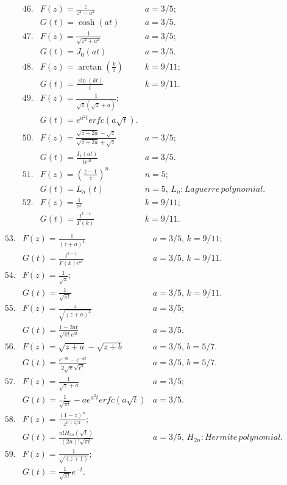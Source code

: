 \documentclass[10pt]{article}
\begin{document}
\[
\begin{array}{llr}
46. & F(z)= \frac{z}{z^{2}-a^{2}} &a=3/5; \\[1cm]
  & G(t)= \cosh(at)&a=3/5.\\[1cm]
47. & F(z)= \frac{1}{\sqrt{z^{2}+a^{2}}} &a=3/5; \\[1cm]
  & G(t)= J_0(at)& a=3/5. \\[1cm]
48. & F(z)= \arctan(\frac{k}{z})&k=9/11; \\[1cm]
  & G(t)= \frac{\sin(kt)}{t}& k=9/11. \\[1cm]
49. & F(z)= \frac{1}{\sqrt{z}(\sqrt{z}+a)};& \\[1cm]
  & G(t)= e^{a^{2}t}erfc(a\sqrt{t}).&  \\[1cm]
50. & F(z)= \frac{\sqrt{z+2a}-\sqrt{z}}{\sqrt{z+2a}+\sqrt{z}}& a=3/5;\\[1cm]
  & G(t)= \frac{I_1(at)}{te^{at}}& a=3/5.  \\[1cm]
51. & F(z)= (\frac{z-1}{z})^{n}& n=5; \\[1cm]
  & G(t)= L_n(t)& n=5, \, L_n: Laguerre \, polynomial. \\[1cm]
52. & F(z)= \frac{1}{z^{k}}&k=9/11; \\[1cm]
  & G(t)= \frac{t^{k-1}}{\Gamma(k)}& k=9/11. \\[1cm]
\end{array}
\]
\[
\begin{array}{llr}
53. & F(z)= \frac{1}{(z+a)^{k}}&a=3/5, \, k=9/11; \\[1cm]
  & G(t)= \frac{t^{k-1}}{\Gamma (k)e^{at}}& a=3/5, \, k=9/11. \\[1cm]
54. & F(z)= \frac{1}{\sqrt{z}};&  \\[1cm]
  & G(t)= \frac{1}{\sqrt{\pi t}}& a=3/5, \, k=9/11. \\[1cm]
55. & F(z)= \frac{z}{\sqrt{(z+a)^{3}}}&a=3/5; \\[1cm]
  & G(t)= \frac{1-2at}{\sqrt{\pi t}e^{at}}&a=3/5.\\[1cm]
56. & F(z)= \sqrt{z+a}-\sqrt{z+b}&a=3/5, \, b=5/7. \\[1cm]
  & G(t)= \frac{e^{-bt}-e^{-at}}{2\sqrt{\pi}\sqrt{t^{3}}}&a=3/5, \, b=5/7.\\[1cm]
57. & F(z)= \frac{1}{\sqrt{z}+a}&a=3/5; \\[1cm]
  & G(t)= \frac{1}{\sqrt{\pi t}}-ae^{a^2t}erfc(a\sqrt{t})&a=3/5.\\[1cm]
58. & F(z)= \frac{(1-z)^{n}}{z^{n+1/2}};& \\[1cm]
  & G(t)= \frac{n!H_{2n}(\sqrt{t})}{(2n)!\sqrt{\pi t}}&a=3/5, \, H_{2n}:Hermite \, polynomial.\\[1cm]
59. & F(z)= \frac{1}{\sqrt{(z+1)}};& \\[1cm]
  & G(t)= \frac{1}{\sqrt{\pi t}}e^{-t}.&\\[1cm]
\end{array}
\]
\end{document}
